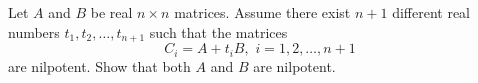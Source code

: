Let $A$ and $B$ be real $n\times n $ matrices. Assume there exist $n+1$ different real numbers $t_{1},t_{2},\dots,t_{n+1}$ such that the matrices
$$C_{i}=A+t_{i}B, \,\,    i=1,2,\dots,n+1$$are nilpotent. Show that both $A$ and $B$ are nilpotent.